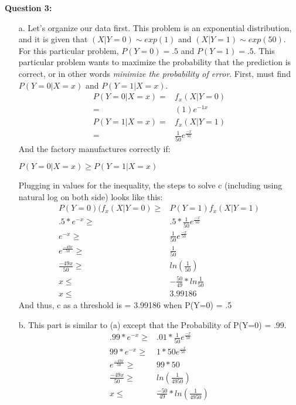 \documentclass{article}
\begin{document}
\textbf{Question 3:}
\begin{enumerate}
	\item[a.] Let's organize our data first. This problem is an exponential distribution, and it is given that $(X|Y=0) \sim exp(1)$ and $(X|Y=1) \sim exp(50)$. For this particular problem,
		$P(Y=0) = .5$ and $P(Y=1) = .5$. This particular problem wants to maximize the probability that the prediction is correct, or in other words \textit{minimize the probability of error}.
		First, must find $P(Y=0 | X=x)$ and $P(Y=1 | X=x)$.
		\begin{align*}
			P(Y=0 | X=x) =& f_{x}(X | Y=0) \\
					=& (1)e^{-1x} \\
			P(Y=1 | X=x) =& f_{x}(X | Y=1) \\
					=& \frac{1}{50}e^{\displaystyle \frac{-x}{50}}
		\end{align*}
		And the factory manufactures correctly if: 
		\begin{center}
			$P(Y=0 | X=x) \geq P(Y=1 | X=x)$
		\end{center}
		Plugging in values for the inequality, the steps to solve c (including using natural log on both side) looks like this:
		\begin{align*}
			P(Y=0)(f_{x}(X | Y=0) \geq& P(Y=1)f_{x}(X | Y=1) \\
			.5 * e^{-x} \geq& .5 * \frac{1}{50}e^{\displaystyle \frac{-x}{50}} \\
			e^{-x} \geq& \frac{1}{50}e^{\displaystyle \frac{-x}{50}} \\
			e^{\displaystyle \frac{-49x}{50}} \geq& \frac{1}{50} \\
			\frac{-49x}{50} \geq& ln(\frac{1}{50}) \\
			x \leq& - \frac{50}{49} *ln{\frac{1}{50}} \\
			x \leq& 3.99186
		\end{align*}
		And thus, c as a threshold is = 3.99186 when P(Y=0) = .5
	\item[b.] This part is similar to (a) except that the Probability of P(Y=0) = .99.
		\begin{align*}
			.99 * e^{-x} \geq& .01 * \frac{1}{50}e^{\displaystyle \frac{-x}{50}} \\
			99 * e^{-x} \geq& 1 * 50e^{\displaystyle \frac{-x}{50}} \\
			e^{\displaystyle \frac{-49x}{50}} \geq& 99 * 50 \\
			\frac{-49x}{50} \geq& ln(\frac{1}{4950}) \\
			x \leq& \frac{-50}{49} * ln(\frac{1}{4950}) \\

\end{align*}
\end{enumerate}
\end{document}
